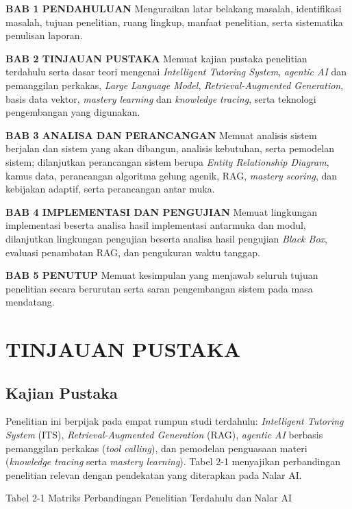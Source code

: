 \documentclass[12pt,a4paper]{article}
\begin{document}
\textbf{BAB 1 PENDAHULUAN}  Menguraikan latar belakang masalah, identifikasi masalah, tujuan penelitian, ruang lingkup, manfaat penelitian, serta sistematika penulisan laporan.

\textbf{BAB 2 TINJAUAN PUSTAKA}  Memuat kajian pustaka penelitian terdahulu serta dasar teori mengenai \textit{Intelligent Tutoring System}, \textit{agentic AI} dan pemanggilan perkakas, \textit{Large Language Model}, \textit{Retrieval-Augmented Generation}, basis data vektor, \textit{mastery learning} dan \textit{knowledge tracing}, serta teknologi pengembangan yang digunakan.

\textbf{BAB 3 ANALISA DAN PERANCANGAN}  Memuat analisis sistem berjalan dan sistem yang akan dibangun, analisis kebutuhan, serta pemodelan sistem; dilanjutkan perancangan sistem berupa \textit{Entity Relationship Diagram}, kamus data, perancangan algoritma gelung agenik, RAG, \textit{mastery scoring}, dan kebijakan adaptif, serta perancangan antar muka.

\textbf{BAB 4 IMPLEMENTASI DAN PENGUJIAN}  Memuat lingkungan implementasi beserta analisa hasil implementasi antarmuka dan modul, dilanjutkan lingkungan pengujian beserta analisa hasil pengujian \textit{Black Box}, evaluasi penambatan RAG, dan pengukuran waktu tanggap.

\textbf{BAB 5 PENUTUP}  Memuat kesimpulan yang menjawab seluruh tujuan penelitian secara berurutan serta saran pengembangan sistem pada masa mendatang.

\section*{TINJAUAN PUSTAKA}
\subsection*{Kajian Pustaka}
Penelitian ini berpijak pada empat rumpun studi terdahulu: \textit{Intelligent Tutoring System} (ITS), \textit{Retrieval-Augmented Generation} (RAG), \textit{agentic AI} berbasis pemanggilan perkakas (\textit{tool calling}), dan pemodelan penguasaan materi (\textit{knowledge tracing} serta \textit{mastery learning}). Tabel 2-1 menyajikan perbandingan penelitian relevan dengan pendekatan yang diterapkan pada Nalar AI.

Tabel 2-1	Matriks Perbandingan Penelitian Terdahulu dan Nalar AI
\end{document}
